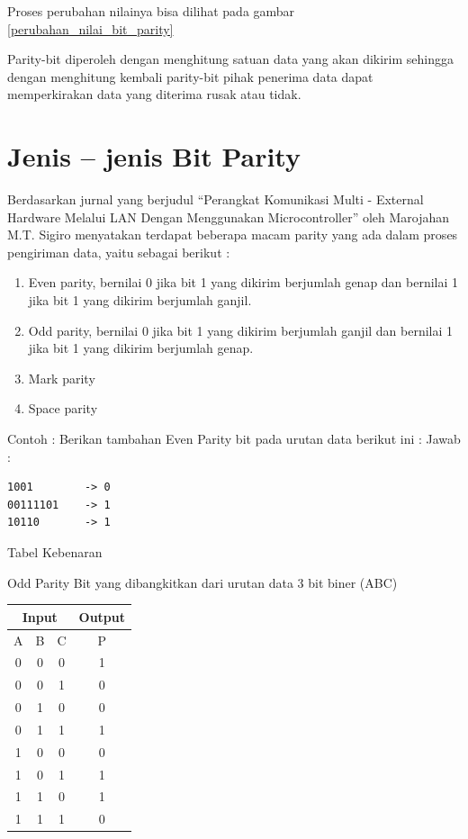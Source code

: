 Proses perubahan nilainya bisa dilihat pada gambar \ref{perubahan_nilai_bit_parity}

Parity-bit diperoleh dengan menghitung satuan data yang akan dikirim sehingga dengan menghitung kembali parity-bit pihak penerima data dapat memperkirakan data yang diterima rusak atau tidak.

\section{Jenis – jenis Bit Parity}
Berdasarkan jurnal yang berjudul “Perangkat Komunikasi Multi - External Hardware Melalui LAN Dengan Menggunakan Microcontroller” oleh Marojahan M.T. Sigiro \cite{ sigiro2013perangkat} menyatakan terdapat beberapa macam parity yang ada dalam proses pengiriman data, yaitu sebagai berikut : 
\begin{enumerate}
\item Even parity, bernilai 0 jika bit 1 yang dikirim berjumlah genap dan bernilai 1 jika bit 1 yang dikirim berjumlah ganjil. 
\item Odd parity, bernilai 0 jika bit 1 yang dikirim berjumlah ganjil dan bernilai 1 jika bit 1 yang dikirim berjumlah genap. 
\item Mark parity 
\item Space parity
\end{enumerate}

Contoh :
\newline Berikan tambahan Even Parity bit pada urutan data berikut ini :
\newline Jawab :
\begin{verbatim}
1001		-> 0
00111101	-> 1
10110		-> 1
\end{verbatim}

Tabel Kebenaran

Odd Parity Bit yang dibangkitkan dari urutan data 3 bit biner (ABC)
\begin{table}[h!]
\begin{tabular}{|c|c|c|c|}
\hline
\multicolumn{3}{|c|}{Input} & Output\\
\hline
A & B & C & P\\
\hline
0 & 0 & 0 & 1\\
\hline
0 & 0 & 1 & 0\\
\hline
0 & 1 & 0 & 0\\
\hline
0 & 1 & 1 & 1\\
\hline
1 & 0 & 0 & 0\\
\hline
1 & 0 & 1 & 1\\
\hline
1 & 1 & 0 & 1\\
\hline
1 & 1 & 1 & 0\\
\hline
\end{tabular}
\end{table}

